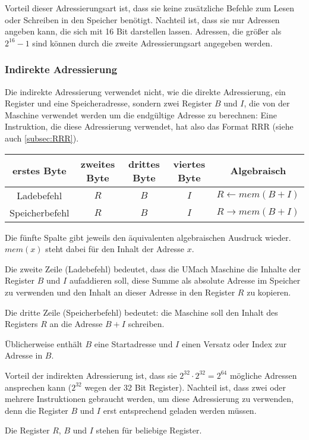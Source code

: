 Vorteil dieser Adressierungsart ist, dass sie keine zusätzliche Befehle zum
Lesen oder Schreiben in den Speicher benötigt. Nachteil ist, dass sie nur
Adressen angeben kann, die sich mit 16 Bit darstellen lassen. Adressen, die
größer als $2^{16} - 1$ sind können durch die zweite Adressierungsart angegeben
werden.


\subsubsection{Indirekte Adressierung}

Die indirekte Adressierung verwendet nicht, wie die direkte Adressierung,
ein Register und eine Speicheradresse, sondern zwei Register $B$ und $I$, die
von der Maschine verwendet werden um die endgültige Adresse zu berechnen:
Eine Instruktion, die diese Adressierung verwendet, hat also das Format RRR
(siehe auch \ref{subsec:RRR}).
\begin{center}
  \begin{tabular}{|*{4}{c|}|c|} \hline
    erstes Byte    & zweites Byte  & drittes Byte  & viertes Byte & Algebraisch
\\\hline\hline
    Ladebefehl     & $R$  & $B$  & $I$  & $R \gets mem(B + I)$ \\\hline
    Speicherbefehl & $R$  & $B$  & $I$  & $R \to   mem(B + I)$ \\\hline
  \end{tabular}
\end{center}
Die fünfte Spalte gibt jeweils den äquivalenten algebraischen Ausdruck wieder.
$mem(x)$ steht dabei für den Inhalt der Adresse $x$.


Die zweite Zeile (Ladebefehl) bedeutet, dass die UMach Maschine die Inhalte der
Register $B$ und $I$ aufaddieren soll, diese Summe als absolute Adresse im
Speicher zu verwenden und den Inhalt an dieser Adresse in den Register $R$ zu
kopieren.

Die dritte Zeile (Speicherbefehl) bedeutet: die Maschine soll den Inhalt des
Registers $R$ an die Adresse $B + I$ schreiben.

Üblicherweise enthält $B$ eine Startadresse und $I$ einen Versatz oder Index zur
Adresse in $B$.

Vorteil der indirekten Adressierung ist, dass sie 
$2^{32} \cdot 2^{32} = 2^{64}$ mögliche
Adressen ansprechen kann ($2^{32}$ wegen der 32 Bit Register).
Nachteil ist, dass zwei oder mehrere Instruktionen gebraucht werden, um diese
Adressierung zu verwenden, denn die Register $B$ und $I$ erst entsprechend geladen
werden müssen.

Die Register $R$, $B$ und $I$ stehen für beliebige Register.
